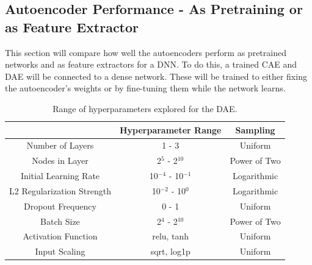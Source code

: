 \subsection{Autoencoder Performance - As Pretraining or as Feature Extractor}

This section will compare how well the autoencoders perform as pretrained networks and as feature extractors for a DNN. To do this, a trained CAE and DAE will be connected to a dense network. These will be trained to either fixing the autoencoder's weights or by fine-tuning them while the network learns.


\begin{table}[H]
\centering
\caption{Range of hyperparameters explored for the DAE.}
\label{table:hyperparameter_dataset_parameters_DAE}
\begin{tabular}{ccc}
 & Hyperparameter Range & Sampling \\ \hline
\multicolumn{1}{c}{Number of Layers} & 1 - 3 & Uniform \\ %
\multicolumn{1}{c}{Nodes in Layer} & 2$^{5}$ - 2$^{10}$ & Power of Two \\ %
\multicolumn{1}{c}{Initial Learning Rate} & 10$^{-4}$ - 10$^{-1}$ & Logarithmic \\ %
\multicolumn{1}{c}{L2 Regularization Strength} & 10$^{-2}$ - 10$^{0}$ & Logarithmic \\ %
\multicolumn{1}{c}{Dropout Frequency} & 0 - 1 & Uniform \\ %
\multicolumn{1}{c}{Batch Size} & 2$^{4}$ - 2$^{10}$ & Power of Two \\ %
\multicolumn{1}{c}{Activation Function} & relu, tanh & Uniform \\ %
\multicolumn{1}{c}{Input Scaling} & sqrt, log1p & Uniform \\ %
\end{tabular}
\end{table}












